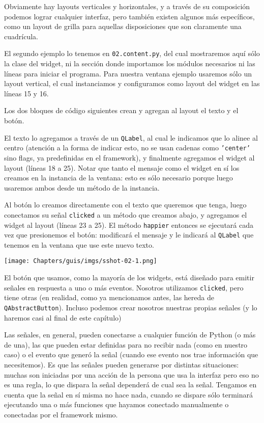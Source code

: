 Obviamente hay layouts verticales y horizontales, y a través de su composición podemos lograr cualquier interfaz, pero también existen algunos más específicos, como un layout de grilla para aquellas disposiciones que son claramente una cuadrícula.

El segundo ejemplo lo tenemos en \texttt{02.content.py}, del cual mostraremos aquí sólo la clase del widget, ni la sección donde importamos los módulos necesarios ni las líneas para iniciar el programa. Para nuestra ventana ejemplo usaremos sólo un layout vertical, el cual instanciamos y configuramos como layout del widget en las líneas 15 y 16.


Los dos bloques de código siguientes crean y agregan al layout el texto y el botón.

El texto lo agregamos a través de un \texttt{QLabel}, al cual le indicamos que lo alinee al centro (atención a la forma de indicar esto, no se usan cadenas como \texttt{'center'} sino flags, ya predefinidas en el framework), y finalmente agregamos el widget al layout (líneas 18 a 25). Notar que tanto el mensaje como el widget en sí los creamos en la instancia de la ventana: esto es sólo necesario porque luego usaremos ambos desde un método de la instancia.

Al botón lo creamos directamente con el texto que queremos que tenga, luego conectamos su señal \texttt{clicked} a un método que creamos abajo, y agregamos el widget al layout (líneas 23 a 25). El método \texttt{happier} entonces se ejecutará cada vez que presionemos el botón: modificará el mensaje y le indicará al \texttt{QLabel} que tenemos en la ventana que use este nuevo texto.

\begin{center}
    \texttt{[image: Chapters/guis/imgs/sshot-02-1.png]}
\end{center}

El botón que usamos, como la mayoría de los widgets, está diseñado para emitir señales en respuesta a uno o más eventos. Nosotros utilizamos \texttt{clicked}, pero tiene otras (en realidad, como ya mencionamos antes, las hereda de \texttt{QAbstractButton}). Incluso podemos crear nosotros nuestras propias señales (y lo haremos casi al final de este capítulo)

Las señales, en general, pueden conectarse a cualquier función de Python (o más de una), las que pueden estar definidas para no recibir nada (como en nuestro caso) o el evento que generó la señal (cuando ese evento nos trae información que necesitemos). Es que las señales pueden generarse por distintas situaciones: muchas son iniciadas por una acción de la persona que usa la interfaz pero eso no es una regla, lo que dispara la señal dependerá de cual sea la señal. Tengamos en cuenta que la señal en sí misma no hace nada, cuando se dispare sólo terminará ejecutando una o más funciones que hayamos conectado manualmente o conectadas por el framework mismo.

